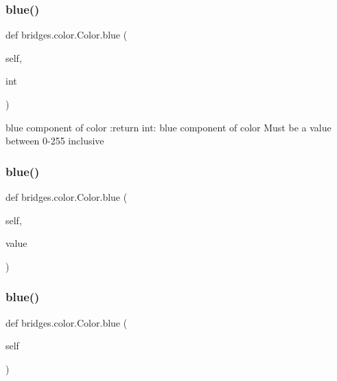 \mbox{\label{classbridges_1_1color_1_1_color_a14f94eb29dcabf578a1932c5477e12f3}} 
\subsubsection{\texorpdfstring{blue()}{blue()}\hspace{0.1cm}{\footnotesize\ttfamily [1/3]}}
{\footnotesize\ttfamily def bridges.\+color.\+Color.\+blue (\begin{DoxyParamCaption}\item[{}]{self,  }\item[{}]{int }\end{DoxyParamCaption})}

\begin{DoxyVerb}blue component of color
:return int: blue component of color
Must be a value between 0-255 inclusive
\end{DoxyVerb}
 \mbox{\label{classbridges_1_1color_1_1_color_a0673063270c8a522b086a916f09dd1f5}} 
\subsubsection{\texorpdfstring{blue()}{blue()}\hspace{0.1cm}{\footnotesize\ttfamily [2/3]}}
{\footnotesize\ttfamily def bridges.\+color.\+Color.\+blue (\begin{DoxyParamCaption}\item[{}]{self,  }\item[{}]{value }\end{DoxyParamCaption})}

\mbox{\label{classbridges_1_1color_1_1_color_a14f94eb29dcabf578a1932c5477e12f3}} 
\subsubsection{\texorpdfstring{blue()}{blue()}\hspace{0.1cm}{\footnotesize\ttfamily [3/3]}}
{\footnotesize\ttfamily def bridges.\+color.\+Color.\+blue (\begin{DoxyParamCaption}\item[{}]{self }\end{DoxyParamCaption})}

